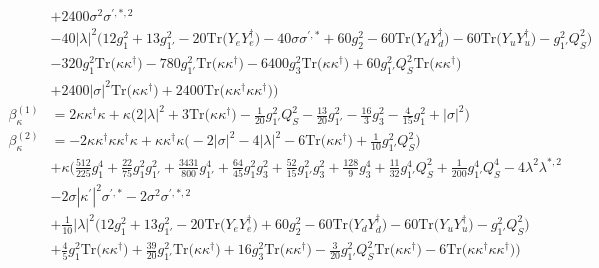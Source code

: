 {\begin{align}
 &+2400 \sigma^{2} \sigma^{\prime,*,2} \nonumber \\ 
 &-40 |\lambda|^2 \Big(12 g_{1}^{2}  + 13 g_{1'}^{2}  -20 \mbox{Tr}\Big({Y_e  Y_{e}^{\dagger}}\Big)  -40 \sigma \sigma^{\prime,*}  + 60 g_{2}^{2}  -60 \mbox{Tr}\Big({Y_d  Y_{d}^{\dagger}}\Big)  -60 \mbox{Tr}\Big({Y_u  Y_{u}^{\dagger}}\Big)  - g_{1'}^{2} Q_{S}^{2} \Big)\nonumber \\ 
 &-320 g_{1}^{2} \mbox{Tr}\Big({\kappa  \kappa^{\dagger}}\Big) -780 g_{1'}^{2} \mbox{Tr}\Big({\kappa  \kappa^{\dagger}}\Big) -6400 g_{3}^{2} \mbox{Tr}\Big({\kappa  \kappa^{\dagger}}\Big) +60 g_{1'}^{2} Q_{S}^{2} \mbox{Tr}\Big({\kappa  \kappa^{\dagger}}\Big) \nonumber \\ 
 &+2400 |\sigma|^2 \mbox{Tr}\Big({\kappa  \kappa^{\dagger}}\Big) +2400 \mbox{Tr}\Big({\kappa  \kappa^{\dagger}  \kappa  \kappa^{\dagger}}\Big) \Big)\\ 
\beta_{\kappa}^{(1)} & =  
2 {\kappa  \kappa^{\dagger}  \kappa}  + \kappa \Big(2 |\lambda|^2  + 3 \mbox{Tr}\Big({\kappa  \kappa^{\dagger}}\Big)  -\frac{1}{20} g_{1'}^{2} Q_{S}^{2}  -\frac{13}{20} g_{1'}^{2}  -\frac{16}{3} g_{3}^{2}  -\frac{4}{15} g_{1}^{2}  + |\sigma|^2\Big)\\ 
\beta_{\kappa}^{(2)} & =  
-2 {\kappa  \kappa^{\dagger}  \kappa  \kappa^{\dagger}  \kappa} +{\kappa  \kappa^{\dagger}  \kappa} \Big(-2 |\sigma|^2  -4 |\lambda|^2  -6 \mbox{Tr}\Big({\kappa  \kappa^{\dagger}}\Big)  + \frac{1}{10} g_{1'}^{2} Q_{S}^{2} \Big)\nonumber \\ 
 &+\kappa \Big(\frac{512}{225} g_{1}^{4} +\frac{22}{75} g_{1}^{2} g_{1'}^{2} +\frac{3431}{800} g_{1'}^{4} +\frac{64}{45} g_{1}^{2} g_{3}^{2} +\frac{52}{15} g_{1'}^{2} g_{3}^{2} +\frac{128}{9} g_{3}^{4} +\frac{11}{32} g_{1'}^{4} Q_{S}^{2} +\frac{1}{200} g_{1'}^{4} Q_{S}^{4} -4 \lambda^{2} \lambda^{*,2} \nonumber \\ 
 &-2 \sigma |\kappa^\prime|^2 \sigma^{\prime,*} -2 \sigma^{2} \sigma^{\prime,*,2} \nonumber \\ 
 &+\frac{1}{10} |\lambda|^2 \Big(12 g_{1}^{2}  + 13 g_{1'}^{2}  -20 \mbox{Tr}\Big({Y_e  Y_{e}^{\dagger}}\Big)  + 60 g_{2}^{2}  -60 \mbox{Tr}\Big({Y_d  Y_{d}^{\dagger}}\Big)  -60 \mbox{Tr}\Big({Y_u  Y_{u}^{\dagger}}\Big)  - g_{1'}^{2} Q_{S}^{2} \Big)\nonumber \\ 
 &+\frac{4}{5} g_{1}^{2} \mbox{Tr}\Big({\kappa  \kappa^{\dagger}}\Big) +\frac{39}{20} g_{1'}^{2} \mbox{Tr}\Big({\kappa  \kappa^{\dagger}}\Big) +16 g_{3}^{2} \mbox{Tr}\Big({\kappa  \kappa^{\dagger}}\Big) -\frac{3}{20} g_{1'}^{2} Q_{S}^{2} \mbox{Tr}\Big({\kappa  \kappa^{\dagger}}\Big) -6 \mbox{Tr}\Big({\kappa  \kappa^{\dagger}  \kappa  \kappa^{\dagger}}\Big) \Big)\\ 

\end{align}}
